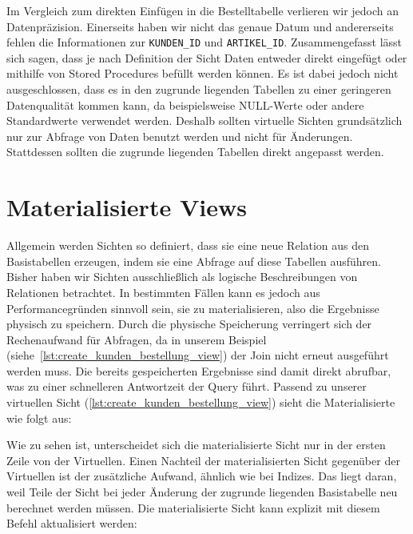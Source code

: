 Im Vergleich zum direkten Einfügen in die Bestelltabelle verlieren wir jedoch an Datenpräzision.
Einerseits haben wir nicht das genaue Datum und andererseits fehlen die Informationen zur \texttt{KUNDEN\_ID} und \texttt{ARTIKEL\_ID}.
Zusammengefasst lässt sich sagen, dass je nach Definition der Sicht Daten entweder direkt eingefügt oder mithilfe von Stored Procedures befüllt werden können.
Es ist dabei jedoch nicht ausgeschlossen, dass es in den zugrunde liegenden Tabellen zu einer geringeren Datenqualität kommen kann, da beispielsweise NULL-Werte oder andere Standardwerte verwendet werden.
Deshalb sollten virtuelle Sichten grundsätzlich nur zur Abfrage von Daten benutzt werden und nicht für Änderungen.
Stattdessen sollten die zugrunde liegenden Tabellen direkt angepasst werden.

\section{Materialisierte Views}\label{sec:materialisierte-views}

Allgemein werden Sichten so definiert, dass sie eine neue Relation aus den Basistabellen erzeugen, indem sie eine Abfrage auf diese Tabellen ausführen.
Bisher haben wir Sichten ausschließlich als logische Beschreibungen von Relationen betrachtet.
In bestimmten Fällen kann es jedoch aus Performancegründen sinnvoll sein, sie zu materialisieren, also die Ergebnisse physisch zu speichern.
Durch die physische Speicherung verringert sich der Rechenaufwand für Abfragen, da in unserem Beispiel (siehe~\ref{lst:create_kunden_bestellung_view}) der Join nicht erneut ausgeführt werden muss.
Die bereits gespeicherten Ergebnisse sind damit direkt abrufbar, was zu einer schnelleren Antwortzeit der Query führt.
Passend zu unserer virtuellen Sicht (\ref{lst:create_kunden_bestellung_view}) sieht die Materialisierte wie folgt aus:

\vspace{-5pt}


Wie zu sehen ist, unterscheidet sich die materialisierte Sicht nur in der ersten Zeile von der Virtuellen.
Einen Nachteil der materialisierten Sicht gegenüber der Virtuellen ist der zusätzliche Aufwand, ähnlich wie bei Indizes.
Das liegt daran, weil Teile der Sicht bei jeder Änderung der zugrunde liegenden Basistabelle neu berechnet werden müssen.
Die materialisierte Sicht kann explizit mit diesem Befehl aktualisiert werden:


